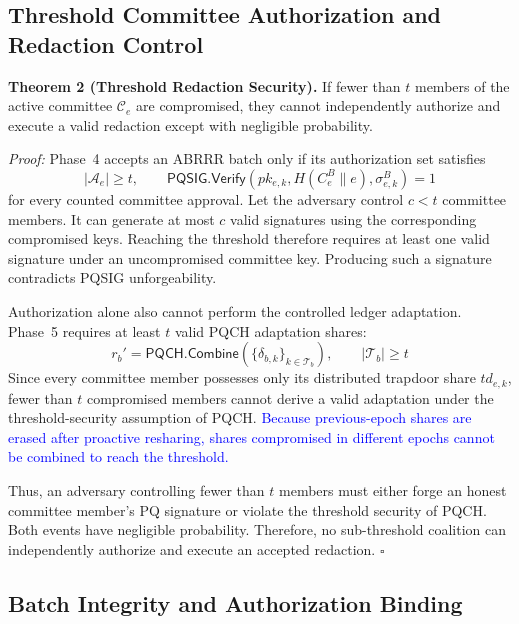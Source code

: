 \documentclass[lettersize,journal]{IEEEtran}
\begin{document}
\subsection{Threshold Committee Authorization and Redaction Control}

\textbf{Theorem 2 (Threshold Redaction Security).}
If fewer than $t$ members of the active committee $\mathcal{C}_e$ are compromised, they cannot independently authorize and execute a valid redaction except with negligible probability.

\emph{Proof:}
Phase~4 accepts an ABRRR batch only if its authorization set satisfies
\begin{equation}
|\mathcal{A}_e|\geq t,
\qquad
\mathsf{PQSIG.Verify}
(pk_{e,k},H(C_e^B\parallel e),\sigma_{e,k}^{B})=1
\label{eq:sec_committee}
\end{equation}
for every counted committee approval. Let the adversary control
$c<t$ committee members. It can generate at most $c$ valid signatures using the corresponding compromised keys. Reaching the threshold therefore requires at least one valid signature under an uncompromised
committee key. Producing such a signature contradicts PQSIG
unforgeability.

Authorization alone also cannot perform the controlled ledger
adaptation. Phase~5 requires at least $t$ valid PQCH adaptation shares:
\begin{equation}
r_b'=
\mathsf{PQCH.Combine}
\left(
\{\delta_{b,k}\}_{k\in\mathcal{T}_b}
\right),
\qquad |\mathcal{T}_b|\geq t
\label{eq:sec_pqch_threshold}
\end{equation}
Since every committee member possesses only its distributed trapdoor share $td_{e,k}$, fewer than $t$ compromised members cannot derive a valid adaptation under the threshold-security assumption of PQCH. \textcolor{blue}{Because previous-epoch shares are erased after proactive resharing, shares compromised in different epochs cannot be combined to reach the threshold.}

Thus, an adversary controlling fewer than $t$ members must either forge an honest committee member's PQ signature or violate the threshold security of PQCH. Both events have negligible probability.
Therefore, no sub-threshold coalition can independently authorize and execute an accepted redaction.
\hfill$\square$


\subsection{Batch Integrity and Authorization Binding}
\end{document}
